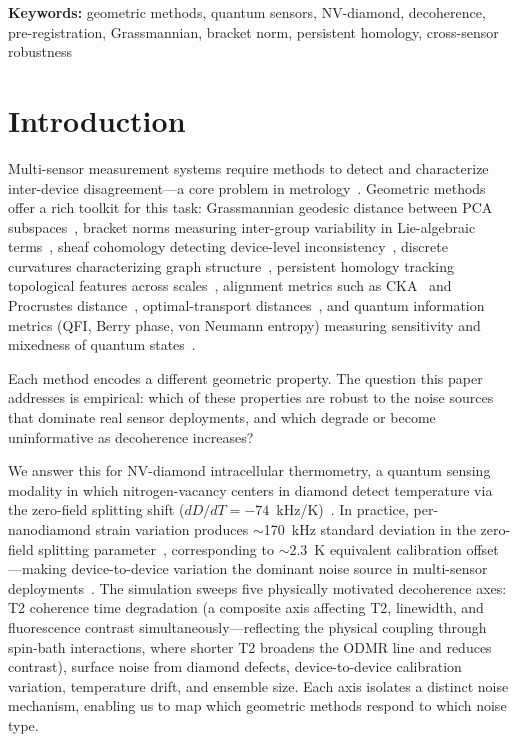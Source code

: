 \documentclass[11pt]{article}
\begin{document}
\noindent\textbf{Keywords:}
geometric methods, quantum sensors, NV-diamond, decoherence,
pre-registration, Grassmannian, bracket norm, persistent homology,
cross-sensor robustness

\section{Introduction}
\label{sec:intro}

Multi-sensor measurement systems require methods to detect and
characterize inter-device disagreement---a core problem in
metrology~\citep{possolo2019evaluation,white2016measurement}.
Geometric methods offer a rich toolkit for this task: Grassmannian geodesic distance between PCA
subspaces~\citep{edelman1998geometry,ye2016schubert,bendokat2024grassmann}, bracket norms
measuring inter-group variability in Lie-algebraic
terms~\citep{tower2026bracket}, sheaf cohomology
detecting device-level
inconsistency~\citep{hansen2019toward,robinson2014topological,curry2014sheaves},
discrete curvatures characterizing graph
structure~\citep{ollivier2009ricci,forman2003bochner},
persistent homology tracking topological features across
scales~\citep{carlsson2009topology,edelsbrunner2010computational,zomorodian2005computing},
alignment metrics such as CKA~\citep{kornblith2019similarity} and
Procrustes distance~\citep{gower2004procrustes},
optimal-transport distances~\citep{villani2009optimal,peyre2019computational},
and quantum information metrics (QFI, Berry phase, von Neumann entropy)
measuring sensitivity and mixedness of quantum
states~\citep{braunstein1994statistical,berry1984quantal,neumann1955mathematical,toth2014quantum}.

Each method encodes a different geometric property.  The question this
paper addresses is empirical: which of these properties are robust to
the noise sources that dominate real sensor deployments, and which
degrade or become uninformative as decoherence increases?

We answer this for NV-diamond intracellular thermometry, a quantum
sensing modality in which nitrogen-vacancy centers in diamond detect
temperature via the zero-field splitting shift ($dD/dT =
-74$~kHz/K)~\citep{kucsko2013nanometre,doherty2013nitrogen,schirhagl2014nitrogen}.
In practice, per-nanodiamond strain variation produces $\sim$170~kHz
standard deviation in the zero-field splitting
parameter~\citep{fujiwara2024fluorescent}, corresponding to
$\sim$2.3~K equivalent calibration offset---making device-to-device
variation the dominant noise source in multi-sensor
deployments~\citep{sekiguchi2023simultaneous,rajpal2025evaluating}.
The simulation sweeps five physically motivated decoherence axes: T2
coherence time degradation (a composite axis affecting T2, linewidth,
and fluorescence contrast simultaneously---reflecting the physical
coupling through spin-bath interactions, where shorter T2 broadens
the ODMR line and reduces contrast), surface noise from diamond
defects, device-to-device calibration variation, temperature drift, and
ensemble size.  Each axis isolates a distinct noise mechanism, enabling
us to map which geometric methods respond to which noise type.
\end{document}
